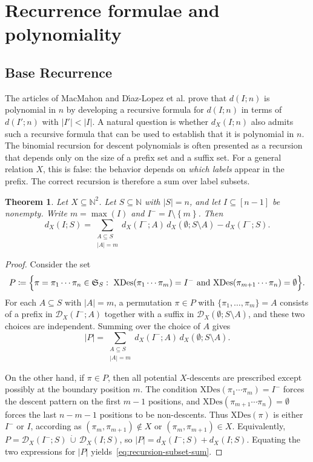 \documentclass[12pt]{amsart}
\newtheorem{theorem}{Theorem}[section]
\theoremstyle{definition}
\theoremstyle{remark}
\newcommand{\N}{\mathbb{N}}
\newcommand{\Sset}{\mathfrak{S}}
\newcommand{\XD}{\mathrm{XDes}}
\newcommand{\set}[1]{\left\{#1\right\}}
\newcommand{\abs}[1]{\left|#1\right|}
\begin{document}
%
\section{Recurrence formulae and polynomiality}\label{sec:recurrence}
%
\subsection{Base Recurrence}

The articles of MacMahon \cite{macmahon1915combinatory} and D\'{\i}az-Lopez et al. \cite{descentpolys} prove that $d(I;n)$ is polynomial in $n$ by developing a recursive formula for $d(I;n)$ in terms of $d(I';n)$ with $|I'|<|I|$. A natural question is whether $d_X(I;n)$ also admits such a recursive formula that can be used to establish that it is polynomial in $n$. The binomial recursion for descent polynomials is often presented as a recursion that depends only on the size of a
prefix set and a suffix set. For a general relation $X$, this is false: the behavior depends on \emph{which labels} appear in the
prefix. The correct recursion is therefore a sum over label subsets.

\begin{theorem}\label{thm:recursion}
Let $X\subseteq\N^2$. Let $S\subseteq\N$ with $\abs{S}=n$, and let $I\subseteq[n-1]$ be nonempty. 
Write $m=\max(I)$ and $I^-=I\setminus\set{m}$.
Then
\begin{equation}\label{eq:recursion-subset-sum}
d_X(I;S)
=
\sum_{\substack{A\subseteq S\\ \abs{A}=m}}
d_X(I^-;A)\,d_X(\emptyset;S\setminus A)
-
d_X(I^-;S).
\end{equation}
\end{theorem}

\begin{proof}
Consider the set
\[
P\coloneqq\Bigl\{\pi=\pi_1\cdots\pi_n\in\Sset_S:\ \XD(\pi_1\cdots\pi_m)=I^-\ \text{and}\ \XD(\pi_{m+1}\cdots\pi_n)=\emptyset\Bigr\}.
\]
For each \(A\subseteq S\) with \(\abs{A}=m\), a permutation \(\pi\in P\) with \(\{\pi_1,\dots,\pi_m\}=A\) consists of a
prefix in \(\mathcal{D}_X(I^-;A)\) together with a suffix in \(\mathcal{D}_X(\emptyset;S\setminus A)\), and these two
choices are independent.  Summing over the choice of \(A\) gives
\[
 \abs{P}=\sum_{\substack{A\subseteq S\\ \abs{A}=m}} d_X(I^-;A)\,d_X(\emptyset;S\setminus A).
\]

On the other hand, if \(\pi\in P\), then all potential \(X\)-descents are prescribed except possibly at the boundary
position \(m\).  The condition \(\XD(\pi_1\cdots\pi_m)=I^-\) forces the descent pattern on the first \(m-1\) positions,
and \(\XD(\pi_{m+1}\cdots\pi_n)=\emptyset\) forces the last \(n-m-1\) positions to be non-descents.  Thus
\(\XD(\pi)\) is either \(I^-\) or \(I\), according as \((\pi_m,\pi_{m+1})\notin X\) or \((\pi_m,\pi_{m+1})\in X\).
Equivalently, $P=\mathcal{D}_X(I^-;S)\,\dot\cup\,\mathcal{D}_X(I;S)$, so
$\abs{P}=d_X(I^-;S)+d_X(I;S).$ Equating the two expressions for \(\abs{P}\) yields~\eqref{eq:recursion-subset-sum}.
\end{proof}
\end{document}
